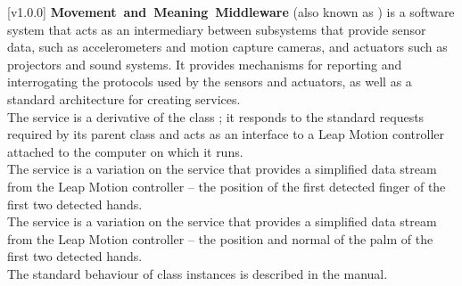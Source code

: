 [v1.0.0]
\textbf{Movement~and~Meaning~Middleware} (also known as \mplusm) is a software system
that acts as an intermediary between subsystems that provide sensor data, such as
accelerometers and motion capture cameras, and actuators such as projectors and sound
systems.
It provides mechanisms for reporting and interrogating the protocols used by the sensors
and actuators, as well as a standard architecture for creating services.\\

The \LMI{} service is a derivative of the \mplusm{} class ;
it responds to the standard requests required by its parent class and acts as an interface
to a Leap Motion controller attached to the computer on which it runs.\\

The \LTFI{} service is a variation on the \LMI{} service that provides a simplified data
stream from the Leap Motion controller -- the position of the first detected finger of
the first two detected hands.\\

The \LTPI{} service is a variation on the \LMI{} service that provides a simplified data
stream from the Leap Motion controller -- the position and normal of the palm of the first
two detected hands.\\

The standard behaviour of  class instances is described in
the \emph{\MMM} manual.
\primaryEnd{}
